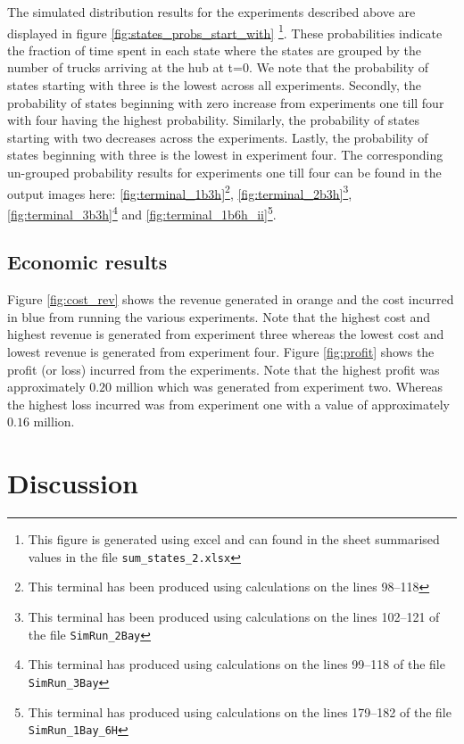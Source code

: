 \documentclass{article}
\theoremstyle{definition}
\theoremstyle{remark}
\numberwithin{equation}{section}
\begin{document}
The simulated distribution results for the experiments described above are displayed in figure \ref{fig:states_probs_start_with} \footnote{This figure is generated using excel and can found in the sheet summarised values in the file \lstinline|sum_states_2.xlsx|}. These probabilities indicate the fraction of time spent in each state where the states are grouped by the number of trucks arriving at the hub at t=0. We note that the probability of states starting with three is the lowest across all experiments. Secondly, the probability of states beginning with zero increase from experiments one till four with four having the highest probability. Similarly, the probability of states starting with two decreases across the experiments. Lastly, the probability of states beginning with three is the lowest in experiment four. The corresponding un-grouped probability results for experiments one till four can be found in the output images here: \ref{fig:terminal_1b3h}\footnote{This terminal has been produced using calculations on the lines 98--118}, \ref{fig:terminal_2b3h}\footnote{This terminal has been produced using calculations on the lines 102--121 of the file \lstinline|SimRun_2Bay|}, \ref{fig:terminal_3b3h}\footnote{This terminal has produced using calculations on the lines 99--118 of the file \lstinline|SimRun_3Bay|} and \ref{fig:terminal_1b6h_ii}\footnote{This terminal has produced using calculations on the lines 179--182 of the file \lstinline|SimRun_1Bay_6H|}.


\subsection{Economic results} \label{econ_res}

Figure \ref{fig:cost_rev} shows the revenue generated in orange and the cost incurred in blue from running the various experiments. Note that the highest cost and highest revenue is generated from experiment three whereas the lowest cost and lowest revenue is generated from experiment four. Figure \ref{fig:profit} shows the profit (or loss) incurred from the experiments. Note that the highest profit was approximately $0.20$ million which was generated from experiment two. Whereas the highest loss incurred was from experiment one with a value of approximately $0.16$ million.

\section{Discussion}
\end{document}
